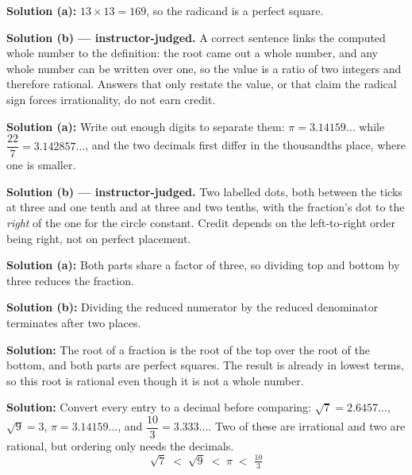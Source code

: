\documentclass[12pt]{article}
\begin{document}

\textbf{Solution (a):} \quad $13 \times 13 = 169$, so the radicand is a perfect square.

\textbf{Solution (b) --- instructor-judged.} \quad A correct sentence links the computed
whole number to the definition: the root came out a whole number, and any whole number can
be written over one, so the value is a ratio of two integers and therefore rational.
Answers that only restate the value, or that claim the radical sign forces irrationality,
do not earn credit.


\textbf{Solution (a):} \quad Write out enough digits to separate them:
$\pi = 3.14159\ldots$ while $\dfrac{22}{7} = 3.142857\ldots$, and the two decimals first
differ in the thousandths place, where one is smaller. \ans{<}

\textbf{Solution (b) --- instructor-judged.} \quad Two labelled dots, both between the
ticks at three and one tenth and at three and two tenths, with the fraction's dot to the
\emph{right} of the one for the circle constant. Credit depends on the left-to-right order
being right, not on perfect placement.


\textbf{Solution (a):} \quad Both parts share a factor of three, so dividing top and
bottom by three reduces the fraction. 

\textbf{Solution (b):} \quad Dividing the reduced numerator by the reduced denominator
terminates after two places. 


\textbf{Solution:} \quad The root of a fraction is the root of the top over the root of
the bottom, and both parts are perfect squares. The result is already in lowest terms, so
this root is rational even though it is not a whole number. 


\textbf{Solution:} \quad Convert every entry to a decimal before comparing:
$\sqrt{7} = 2.6457\ldots$, $\sqrt{9} = 3$, $\pi = 3.14159\ldots$, and
$\dfrac{10}{3} = 3.333\ldots$. Two of these are irrational and two are rational, but
ordering only needs the decimals.
\[ \boxed{\sqrt{7} \;<\; \sqrt{9} \;<\; \pi \;<\; \tfrac{10}{3}} \]
\end{document}
